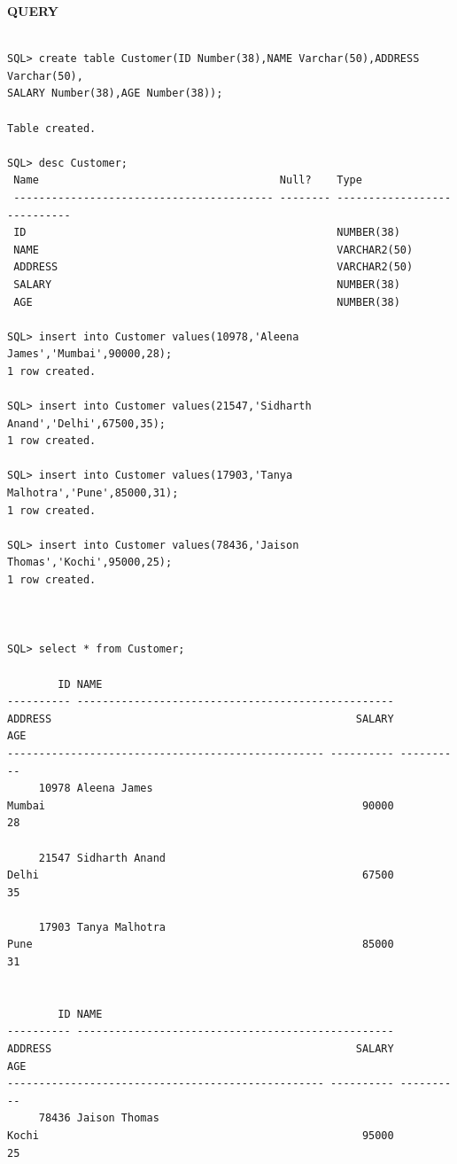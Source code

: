 \documentclass[a4paper,12pt]{report}
\begin{document}
\begin{flushleft}
\textbf{QUERY }
\end{flushleft}
 \begin{verbatim}

SQL> create table Customer(ID Number(38),NAME Varchar(50),ADDRESS Varchar(50),
SALARY Number(38),AGE Number(38));

Table created.

SQL> desc Customer;
 Name                                      Null?    Type
 ----------------------------------------- -------- ----------------------------
 ID                                                 NUMBER(38)
 NAME                                               VARCHAR2(50)
 ADDRESS                                            VARCHAR2(50)
 SALARY                                             NUMBER(38)
 AGE                                                NUMBER(38)

SQL> insert into Customer values(10978,'Aleena James','Mumbai',90000,28);
1 row created.

SQL> insert into Customer values(21547,'Sidharth Anand','Delhi',67500,35);
1 row created.

SQL> insert into Customer values(17903,'Tanya Malhotra','Pune',85000,31);
1 row created.

SQL> insert into Customer values(78436,'Jaison Thomas','Kochi',95000,25);
1 row created.



SQL> select * from Customer;

        ID NAME
---------- --------------------------------------------------
ADDRESS                                                SALARY        AGE
-------------------------------------------------- ---------- ----------
     10978 Aleena James
Mumbai                                                  90000         28

     21547 Sidharth Anand
Delhi                                                   67500         35

     17903 Tanya Malhotra
Pune                                                    85000         31


        ID NAME
---------- --------------------------------------------------
ADDRESS                                                SALARY        AGE
-------------------------------------------------- ---------- ----------
     78436 Jaison Thomas
Kochi                                                   95000         25

\end{verbatim}
\end{document}
